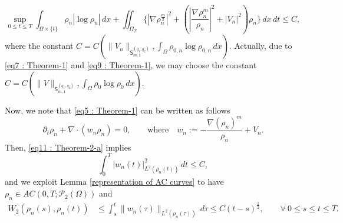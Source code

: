 \documentclass{amsart}
\numberwithin{equation}{section}
\begin{document}
\begin{equation}\label{eq11 : Theorem-2-a}
\sup_{0\leq t \leq T}\int_{\Omega \times \{ t\}}\rho_n |\log \rho_n|  \,dx
+ \iint_{\Omega_T} \{ \left|\nabla \rho_{n}^{\frac{m}{2}} \right|^2 + \left (\left | \frac{\nabla \rho_n^m}{\rho_n}\right |^{2} +|V_n|^{2} \right )\rho_n \}\,dx\,dt  \leq C,
\end{equation}
 where the constant $C=C ( \|V_n\|_{\mathsf{S}_{m, 1}^{(q_1,q_2)}}, \int_{\Omega} \rho_{0,n} \log \rho_{0,n} \,dx )$.
 Actually, due to \eqref{eq7 : Theorem-1} and \eqref{eq9 : Theorem-1}, we may choose the constant
$C=C ( \|V\|_{\mathsf{S}_{m, 1}^{(q_1,q_2)}}, \int_{\Omega} \rho_{0} \log \rho_{0} \,dx )$. 

Now, we note that \eqref{eq5 : Theorem-1} can be written as follows
$$\partial_t \rho_n +  \nabla \cdot (w_n \rho_n )=0, \qquad \mbox{where}\quad
w_n:= -\frac{\nabla (\rho_n)^m}{\rho_n}+ V_n.$$
Then, \eqref{eq11 : Theorem-2-a} implies
\begin{equation*}\label{eq25 : Theorem-1}
\int_0^T  |w_{n}(t)|_{L^{2}(\rho_n(t))}^{2} \,dt \leq C,
\end{equation*}
and we exploit Lemma \ref{representation of AC curves} to have $\rho_n \in AC(0,T;\mathcal{P}_{2}(\Omega))$ and
\begin{equation}\label{eq35 : Theorem-a}
\begin{aligned}
W_{2}(\rho_n(s),\rho_n(t)) &\leq \int_s^t  \|w_n(\tau)\|_{L^{2}(\rho_n(\tau))} \,d\tau \leq  C (t-s)^{\frac{1}{2}}, \qquad \forall ~ 0\leq s\leq t\leq T.
\end{aligned}
\end{equation}
%
%
%
%
%
%
\end{document}
